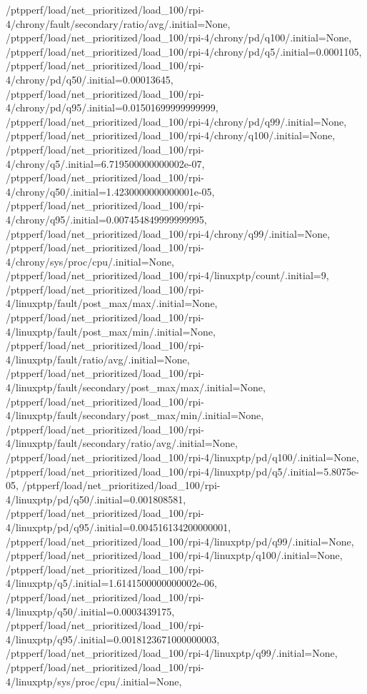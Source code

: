 {    /ptpperf/load/net_prioritized/load_100/rpi-4/chrony/fault/secondary/ratio/avg/.initial=None,
    /ptpperf/load/net_prioritized/load_100/rpi-4/chrony/pd/q100/.initial=None,
    /ptpperf/load/net_prioritized/load_100/rpi-4/chrony/pd/q5/.initial=0.0001105,
    /ptpperf/load/net_prioritized/load_100/rpi-4/chrony/pd/q50/.initial=0.00013645,
    /ptpperf/load/net_prioritized/load_100/rpi-4/chrony/pd/q95/.initial=0.01501699999999999,
    /ptpperf/load/net_prioritized/load_100/rpi-4/chrony/pd/q99/.initial=None,
    /ptpperf/load/net_prioritized/load_100/rpi-4/chrony/q100/.initial=None,
    /ptpperf/load/net_prioritized/load_100/rpi-4/chrony/q5/.initial=6.719500000000002e-07,
    /ptpperf/load/net_prioritized/load_100/rpi-4/chrony/q50/.initial=1.4230000000000001e-05,
    /ptpperf/load/net_prioritized/load_100/rpi-4/chrony/q95/.initial=0.007454849999999995,
    /ptpperf/load/net_prioritized/load_100/rpi-4/chrony/q99/.initial=None,
    /ptpperf/load/net_prioritized/load_100/rpi-4/chrony/sys/proc/cpu/.initial=None,
    /ptpperf/load/net_prioritized/load_100/rpi-4/linuxptp/count/.initial=9,
    /ptpperf/load/net_prioritized/load_100/rpi-4/linuxptp/fault/post_max/max/.initial=None,
    /ptpperf/load/net_prioritized/load_100/rpi-4/linuxptp/fault/post_max/min/.initial=None,
    /ptpperf/load/net_prioritized/load_100/rpi-4/linuxptp/fault/ratio/avg/.initial=None,
    /ptpperf/load/net_prioritized/load_100/rpi-4/linuxptp/fault/secondary/post_max/max/.initial=None,
    /ptpperf/load/net_prioritized/load_100/rpi-4/linuxptp/fault/secondary/post_max/min/.initial=None,
    /ptpperf/load/net_prioritized/load_100/rpi-4/linuxptp/fault/secondary/ratio/avg/.initial=None,
    /ptpperf/load/net_prioritized/load_100/rpi-4/linuxptp/pd/q100/.initial=None,
    /ptpperf/load/net_prioritized/load_100/rpi-4/linuxptp/pd/q5/.initial=5.8075e-05,
    /ptpperf/load/net_prioritized/load_100/rpi-4/linuxptp/pd/q50/.initial=0.001808581,
    /ptpperf/load/net_prioritized/load_100/rpi-4/linuxptp/pd/q95/.initial=0.004516134200000001,
    /ptpperf/load/net_prioritized/load_100/rpi-4/linuxptp/pd/q99/.initial=None,
    /ptpperf/load/net_prioritized/load_100/rpi-4/linuxptp/q100/.initial=None,
    /ptpperf/load/net_prioritized/load_100/rpi-4/linuxptp/q5/.initial=1.6141500000000002e-06,
    /ptpperf/load/net_prioritized/load_100/rpi-4/linuxptp/q50/.initial=0.0003439175,
    /ptpperf/load/net_prioritized/load_100/rpi-4/linuxptp/q95/.initial=0.0018123671000000003,
    /ptpperf/load/net_prioritized/load_100/rpi-4/linuxptp/q99/.initial=None,
    /ptpperf/load/net_prioritized/load_100/rpi-4/linuxptp/sys/proc/cpu/.initial=None,
}
